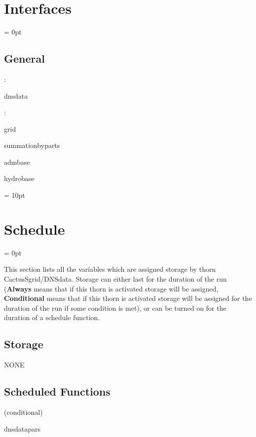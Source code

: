 \section{Interfaces} 


\parskip = 0pt

\vspace{3mm} \subsection*{General}

: 

dnsdata
\vspace{2mm}

: 

grid

summationbyparts

admbase

hydrobase
\vspace{2mm}

\vspace{5mm}\parskip = 10pt 

\section{Schedule} 


\parskip = 0pt


\noindent This section lists all the variables which are assigned storage by thorn CactusSgrid/DNSdata.  Storage can either last for the duration of the run ({\bf Always} means that if this thorn is activated storage will be assigned, {\bf Conditional} means that if this thorn is activated storage will be assigned for the duration of the run if some condition is met), or can be turned on for the duration of a schedule function.


\subsection*{Storage}NONE
\subsection*{Scheduled Functions}
\vspace{5mm}

   (conditional) 

\hspace{5mm} dnsdatapars 

\hspace{5mm}{\it read pars from bnsdata\_properties.txt } 


